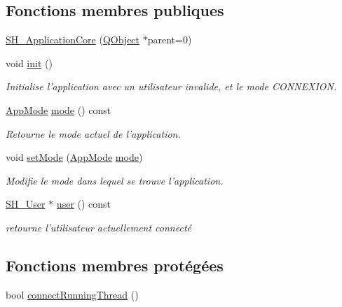 \subsection*{Fonctions membres publiques}
\begin{DoxyCompactItemize}
\item 
\hyperlink{classSH__ApplicationCore_a3c33fe8a39bd571c4c809d8c55603156}{S\-H\-\_\-\-Application\-Core} (\hyperlink{classQObject}{Q\-Object} $\ast$parent=0)
\item 
void \hyperlink{classSH__ApplicationCore_acc4f20b555300706bc08424c71c6bf02}{init} ()
\begin{DoxyCompactList}\small\item\em Initialise l'application avec un utilisateur invalide, et le mode {\itshape C\-O\-N\-N\-E\-X\-I\-O\-N}. \end{DoxyCompactList}\item 
\hyperlink{classSH__ApplicationCore_a6b93b2f83a290305f282616eb2935899}{App\-Mode} \hyperlink{classSH__ApplicationCore_a5d9ecb0e578e78d84591e36dccdf3d07}{mode} () const 
\begin{DoxyCompactList}\small\item\em Retourne le mode actuel de l'application. \end{DoxyCompactList}\item 
void \hyperlink{classSH__ApplicationCore_a2bfe19528b27831332559d5d2cd24d25}{set\-Mode} (\hyperlink{classSH__ApplicationCore_a6b93b2f83a290305f282616eb2935899}{App\-Mode} \hyperlink{classSH__ApplicationCore_a5d9ecb0e578e78d84591e36dccdf3d07}{mode})
\begin{DoxyCompactList}\small\item\em Modifie le mode dans lequel se trouve l'application. \end{DoxyCompactList}\item 
\hyperlink{classSH__User}{S\-H\-\_\-\-User} $\ast$ \hyperlink{classSH__ApplicationCore_a57fa0d6b5fd5f4a02f8a129ee470697b}{user} () const 
\begin{DoxyCompactList}\small\item\em retourne l'utilisateur actuellement connecté \end{DoxyCompactList}\end{DoxyCompactItemize}
\subsection*{Fonctions membres protégées}
\begin{DoxyCompactItemize}
\item 
bool \hyperlink{classSH__ApplicationCore_a264c6e0c0c2e25a36a2502d1d9bcb109}{connect\-Running\-Thread} ()
\end{DoxyCompactItemize}
